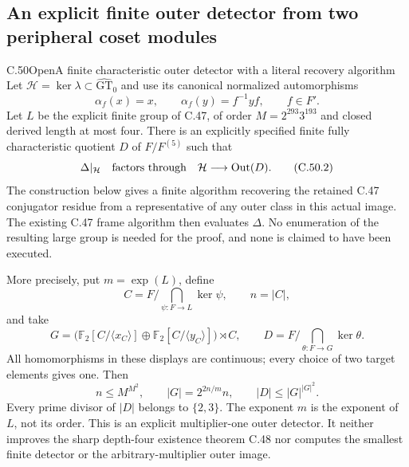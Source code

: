 \subsection{An explicit finite outer detector from two peripheral coset modules}

\begin{statement}{C.50}{Open}{A finite characteristic outer detector with a literal recovery algorithm}
Let $\mathcal H=\ker\lambda\subset\widehat{\mathrm{GT}}_0$ and
use its canonical normalized automorphisms
\[
             \alpha_f(x)=x,\qquad \alpha_f(y)=f^{-1}yf,
                    \qquad f\in F'.                     \tag{C.50.1}
\]
Let $L$ be the explicit finite group of C.47, of order
$M=2^{293}3^{193}$ and closed derived length at most four.
There is an explicitly specified finite fully characteristic quotient
$D$ of $F/F^{(5)}$ such that
\[
       \Delta|_{\mathcal H}\quad\hbox{factors through}\quad
              \mathcal H\longrightarrow\operatorname{Out}(D).
                                                               \tag{C.50.2}
\]
The construction below gives a finite algorithm recovering the retained
C.47 conjugator residue from a representative of any outer class in
this actual image. The existing C.47 frame algorithm then evaluates
$\Delta$. No enumeration of the resulting large group is needed for
the proof, and none is claimed to have been executed.

More precisely, put $m=\exp(L)$, define
\[
 C=F\Big/\bigcap_{\psi:F\to L}\ker\psi,
                    \qquad n=|C|,
                                                               \tag{C.50.3}
\]
and take
\[
 G=\bigl(\mathbb F_2[C/\langle x_C\rangle]
          \oplus\mathbb F_2[C/\langle y_C\rangle]\bigr)\rtimes C,
 \qquad
 D=F\Big/\bigcap_{\theta:F\to G}\ker\theta.           \tag{C.50.4}
\]
All homomorphisms in these displays are continuous; every choice of
two target elements gives one. Then
\[
 n\le M^{M^2},\qquad |G|=2^{2n/m}n,
                    \qquad |D|\le |G|^{|G|^2}.        \tag{C.50.5}
\]
Every prime divisor of $|D|$ belongs to $\{2,3\}$.
The exponent $m$ is the exponent of $L$, not its order.
This is an explicit multiplier-one outer detector. It neither
improves the sharp depth-four existence theorem C.48 nor computes
the smallest finite detector or the arbitrary-multiplier outer image.
\end{statement}

